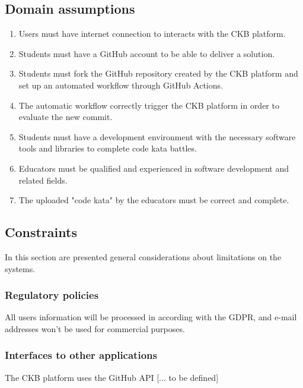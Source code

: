 \subsection{Domain assumptions}
\begin{enumerate}[label=\textbf{DA.\arabic*}]
        \item {} {Users must have internet connection to interacts with the CKB platform.}
        \item {} {Students must have a GitHub account to be able to deliver a solution.}
        \item {} {Students must fork the GitHub repository created by the CKB platform and set up an automated workflow through GitHub Actions.}
        \item {} {The automatic workflow correctly trigger the CKB platform in order to evaluate the new commit.}
        \item {} {Students must have a development environment with the necessary software tools and libraries to complete code kata battles.}
        \item {} {Educators must be qualified and experienced in software development and related fields.}
        \item {} {The uploaded "code kata" by the educators must be correct and complete.}
\end{enumerate}

\subsection{Constraints}
In this section are presented general considerations about limitations on the systems.

\subsubsection{Regulatory policies}
All users information will be processed in according with the GDPR, and e-mail addresses won't be used for commercial purposes.

\subsubsection{Interfaces to other applications}
The CKB platform uses the GitHub API [... to be defined]
